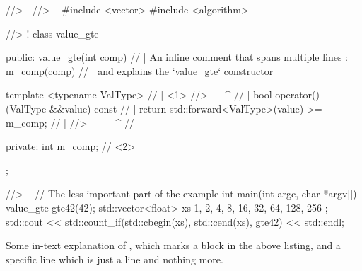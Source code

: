 \documentclass{article}
\begin{document}
\begin{othercoder}
//> |
//> ~
    #include <vector>
    #include <algorithm>

//> !
    class value_gte {
    public:
        value_gte(int comp)  // | An inline comment that spans multiple lines
            : m_comp(comp)   // | and explains the `value_gte` constructor
        {
        }

        template <typename ValType>                         // | <1>
//>           ^^^^^^^^^^^^^^^^                              // |
        bool operator() (ValType &&value) const {           // |
            return std::forward<ValType>(value) >= m_comp;  // |
//>            ^^^^^^^^^^^^^^^^^^^^^^^^^^^^
        }                                                   // |

    private:
        int m_comp; // <2>
    };

//> ~
    // The less important part of the example
    int main(int argc, char *argv[])
    {
        value_gte gte42(42);
        std::vector<float> xs { 1, 2, 4, 8, 16, 32, 64, 128, 256 };
        std::cout << std::count_if(std::cbegin(xs), std::cend(xs), gte42)
                  << std::endl;
    }
\end{othercoder}

Some in-text explanation of ,
which marks a block in the above listing,
and a specific line 
which is just a line and nothing more.
\end{document}
